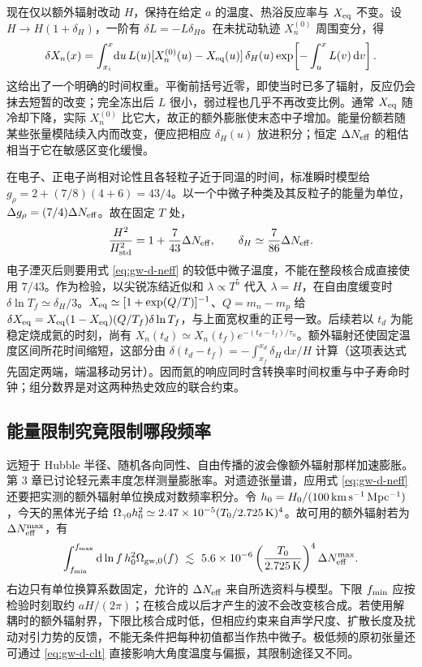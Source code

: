现在仅以额外辐射改动 $H$，保持在给定 $a$ 的温度、热浴反应率与 $X_{\rm eq}$ 不变。设 $H\to H(1+\delta_H)$，一阶有 $\delta L=-L\delta_H$。在未扰动轨迹 $X_n^{(0)}$ 周围变分，得
\[
 \delta X_n(x)=\int_{x_i}^x\!\mathrm du\,
 L(u)[X_n^{(0)}(u)-X_{\rm eq}(u)]\,\delta_H(u)
 \exp\!\left[-\int_u^xL(v)\,\mathrm dv\right].
\]
这给出了一个明确的时间权重。平衡前括号近零，即使当时已多了辐射，反应仍会抹去短暂的改变；完全冻出后 $L$ 很小，弱过程也几乎不再改变比例。通常 $X_{\rm eq}$ 随冷却下降，实际 $X_n^{(0)}$ 比它大，故正的额外膨胀使末态中子增加。能量份额若随某些张量模陆续入内而改变，便应把相应 $\delta_H(u)$ 放进积分；恒定 $\Delta N_{\rm eff}$ 的粗估相当于它在敏感区变化缓慢。

在电子、正电子尚相对论性且各轻粒子近于同温的时间，标准瞬时模型给 $g_\rho=2+(7/8)(4+6)=43/4$。以一个中微子种类及其反粒子的能量为单位，$\Delta g_\rho=(7/4)\Delta N_{\rm eff}$。故在固定 $T$ 处，
\[
 \frac{H^2}{H_{\rm std}^2}=1+\frac7{43}\Delta N_{\rm eff},
 \qquad
 \delta_H\simeq\frac7{86}\Delta N_{\rm eff}.
\]
电子湮灭后则要用式 \eqref{eq:gw-d-neff} 的较低中微子温度，不能在整段核合成直接使用 $7/43$。作为检验，以尖锐冻结近似和 $\lambda\propto T^5$ 代入 $\lambda=H$，在自由度缓变时 $\delta\ln T_f\simeq\delta_H/3$。$X_{\rm eq}\simeq[1+\exp(Q/T)]^{-1}$、$Q=m_n-m_p$ 给 $\delta X_{\rm eq}=X_{\rm eq}(1-X_{\rm eq})(Q/T_f)\delta\ln T_f$，与上面宽权重的正号一致。后续若以 $t_d$ 为能稳定烧成氦的时刻，尚有 $X_n(t_d)\simeq X_n(t_f)e^{-(t_d-t_f)/\tau_n}$。额外辐射还使固定温度区间所花时间缩短，这部分由 $\delta(t_d-t_f)=-\int_{x_f}^{x_d}\delta_H\,\mathrm dx/H$ 计算（这项表达式先固定两端，端温移动另计）。因而氦的响应同时含转换率时间权重与中子寿命时钟；组分数界是对这两种热史效应的联合约束。
\subsection{能量限制究竟限制哪段频率}

远短于 Hubble 半径、随机各向同性、自由传播的波会像额外辐射那样加速膨胀。第 3 章已讨论轻元素丰度怎样测量膨胀率。对遗迹张量谱，应用式 \eqref{eq:gw-d-neff} 还要把实测的额外辐射单位换成对数频率积分。令 $h_0=H_0/(100\,{\rm km\,s^{-1}\,Mpc^{-1}})$，今天的黑体光子给 $\Omega_{\gamma0}h_0^2\simeq2.47\times10^{-5}(T_0/2.725\,{\rm K})^4$。故可用的额外辐射若为 $\Delta N_{\rm eff}^{\max}$，有
\begin{equation}\label{eq:gw-d-integral}
 \int_{f_{\rm min}}^{f_{\rm max}}\mathrm d\ln f\,h_0^2\Omega_{{\rm gw},0}(f)
 \ \lesssim\
 5.6\times10^{-6}\left(\frac{T_0}{2.725\,{\rm K}}\right)^4
 \Delta N_{\rm eff}^{\max}.
\end{equation}
右边只有单位换算系数固定，允许的 $\Delta N_{\rm eff}$ 来自所选资料与模型。下限 $f_{\rm min}$ 应按检验时刻取约 $aH/(2\pi)$；在核合成以后才产生的波不会改变核合成。若使用解耦时的额外辐射界，下限比核合成时低，但相应约束来自声学尺度、扩散长度及扰动对引力势的反馈，不能无条件把每种初值都当作热中微子。极低频的原初张量还可通过 \eqref{eq:gw-d-clt} 直接影响大角度温度与偏振，其限制途径又不同。


